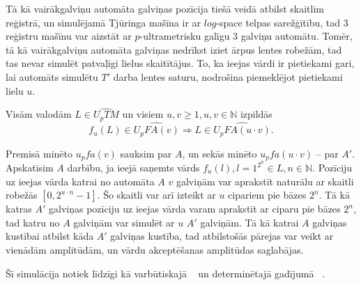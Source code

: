 \documentclass{ludis}
\begin{document}
\begin{pieradijums}
Tā kā vairākgalviņu automāta galviņas pozīcija tiešā veidā atbilst skaitlim reģistrā, un simulējamā Tjūringa mašīna ir ar $log$-space telpas sarežģītību, tad $3$ reģistru mašīnu var aizstāt ar $p$-ultrametrisku galīgu $3$ galviņu automātu. Tomēr, tā kā vairākgalviņu automāta galviņas nedrīkst iziet ārpus lentes robežām, tad tas nevar simulēt patvaļīgi lielus skaitītājus. To, ka ieejas vārdi ir pietiekami gari, lai automāts simulētu $T'$ darba lentes saturu, nodrošina piemeklējot pietiekami lielu $u$.
\end{pieradijums}

\begin{lemma} \label{reizinajums}
Visām valodām $L \in \widehat{U_pTM}$ un visiem $u, v \geq 1, u, v \in \mathbb{N}$ izpildās
\[
	f_u(L) \in \widehat{U_pFA(v)} \Rightarrow L \in \widehat{U_pFA(u \cdot v)}.
\]
\end{lemma}
\begin{pieradijums}
Premisā minēto $u_pfa(v)$ sauksim par $A$, un sekās minēto $u_pfa(u \cdot v)$ -- par $A'$.
Apskatīsim $A$ darbību, ja ieejā saņemts vārds $f_u(l), l = 1^{2^n} \in L, n \in \mathbb{N}$. Pozīciju uz ieejas vārda katrai no automāta $A$ $v$ galviņām var aprakstīt naturālu ar skaitli robežās $\left[0, 2^{u \cdot n} -1 \right]$. Šo skaitli var arī izteikt ar $u$ cipariem pie bāzes $2^n$. Tā kā katras $A'$ galviņas pozīciju uz ieejas vārda varam aprakstīt ar ciparu pie bāzes $2^n$, tad katru no $A$ galviņām var simulēt ar $u$ $A'$ galviņām. Tā kā katrai $A$ galviņas kustībai atbilst kāda $A'$ galviņas kustība, tad atbilstošās pārejas var veikt ar vienādām amplitūdām, un vārdu akceptēšanas amplitūdas saglabājas.

Šī simulācija notiek līdzīgi kā varbūtiskajā ~\citep{Macarie1995} un determinētajā gadījumā ~\citep{Monien1980}.
\end{pieradijums}
\end{document}
